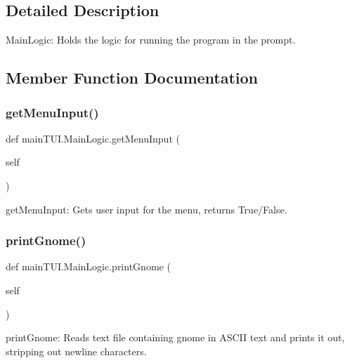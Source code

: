 \subsection{Detailed Description}
\begin{DoxyVerb}MainLogic: Holds the logic for running the program in the prompt.  \end{DoxyVerb}
 

\subsection{Member Function Documentation}
\hypertarget{classmain_t_u_i_1_1_main_logic_ab5d87725a59118bc0816a8a1dd21f06f}{}\label{classmain_t_u_i_1_1_main_logic_ab5d87725a59118bc0816a8a1dd21f06f} 
\subsubsection{\texorpdfstring{get\+Menu\+Input()}{getMenuInput()}}
{\footnotesize\ttfamily def main\+T\+U\+I.\+Main\+Logic.\+get\+Menu\+Input (\begin{DoxyParamCaption}\item[{}]{self }\end{DoxyParamCaption})}

\begin{DoxyVerb}getMenuInput: Gets user input for the menu, returns True/False. \end{DoxyVerb}
 \hypertarget{classmain_t_u_i_1_1_main_logic_a91c2a1b004ea6a497dd81ed41528c650}{}\label{classmain_t_u_i_1_1_main_logic_a91c2a1b004ea6a497dd81ed41528c650} 
\subsubsection{\texorpdfstring{print\+Gnome()}{printGnome()}}
{\footnotesize\ttfamily def main\+T\+U\+I.\+Main\+Logic.\+print\+Gnome (\begin{DoxyParamCaption}\item[{}]{self }\end{DoxyParamCaption})}

\begin{DoxyVerb}printGnome: Reads text file containing gnome in ASCII text and
    prints it out, stripping out newline characters. \end{DoxyVerb}
 \hypertarget{classmain_t_u_i_1_1_main_logic_a0850095d67fa526a848768588eb06ea6}{}\label{classmain_t_u_i_1_1_main_logic_a0850095d67fa526a848768588eb06ea6} 
